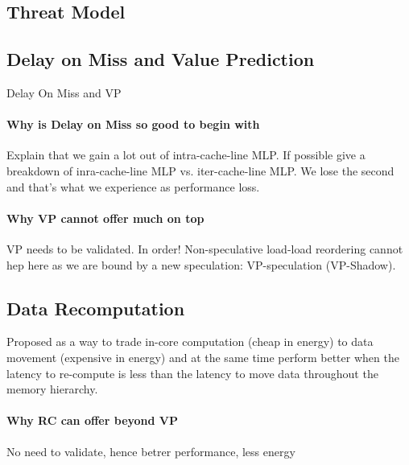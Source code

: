 \subsection{Threat Model}
\label{sec:threat}

\subsection{Delay on Miss and Value Prediction}
\label{sec:dom-vp}
Delay On Miss and VP

\paragraph{Why is Delay on Miss so good to begin with}
Explain that we gain a lot out of intra-cache-line MLP.
If possible give a breakdown of inra-cache-line MLP vs. iter-cache-line MLP.
We lose the second and that's what we experience as performance loss.

\paragraph{Why VP cannot offer much on top}
VP needs to be validated. In order! Non-speculative load-load reordering cannot hep here as we are bound by a new speculation: VP-speculation (VP-Shadow).

\subsection{Data Recomputation}
\label{sec:recmp}
Proposed as a way to trade in-core computation (cheap in energy) to data movement (expensive in energy) and at the same time perform better when the latency to re-compute is less than the latency to move data throughout the memory hierarchy.
\paragraph{Why RC can offer beyond VP}
No need to validate, hence betrer performance, less energy